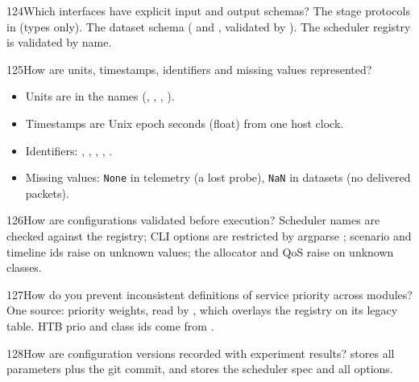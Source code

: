 \begin{qa}{124}{Which interfaces have explicit input and output schemas?}
The stage protocols in  (types only). The dataset schema ( and
, validated by ). The scheduler registry is validated by name.
\end{qa}

\begin{qa}{125}{How are units, timestamps, identifiers and missing values represented?}
\begin{itemize}
\item Units are in the names (, , , ).
\item Timestamps are Unix epoch seconds (float) from one host clock.
\item Identifiers: , , , , .
\item Missing values: \texttt{None} in telemetry (a lost probe), \texttt{NaN} in datasets (no delivered packets).
\end{itemize}
\end{qa}

\begin{qa}{126}{How are configurations validated before execution?}
Scheduler names are checked against the registry; CLI options are restricted by argparse ; scenario
and timeline ids raise on unknown values; the allocator and QoS raise on unknown classes.
\end{qa}

\begin{qa}{127}{How do you prevent inconsistent definitions of service priority across modules?}
One source:  priority weights, read by , which overlays the
registry on its legacy table. HTB prio and class ids come from .
\end{qa}

\begin{qa}{128}{How are configuration versions recorded with experiment results?}
 stores all parameters plus the git commit, and  stores the scheduler spec and
all options.
\end{qa}

